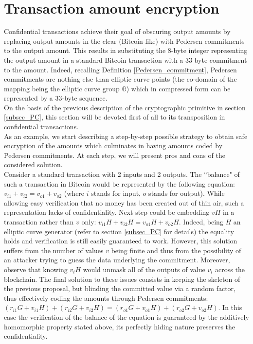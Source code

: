 \section{Transaction amount encryption}
\label{sec::tx_am_encr}
Confidential transactions achieve their goal of obscuring output amounts by replacing output amounts in the clear (Bitcoin-like) with Pedersen commitments to the output amount. This results in substituting the 8-byte integer representing the output amount in a standard Bitcoin transaction with a 33-byte commitment to the amount. Indeed, recalling Definition \ref{Pedersen_commitment}, Pedersen commitments are nothing else than elliptic curve points (the co-domain of the mapping being the elliptic curve group $\mathbb{G}$) which in compressed form can be represented by a 33-byte sequence.\\
On the basis of the previous description of the cryptographic primitive in section \ref{subsec_PC}, this section will be devoted first of all to its transposition in confidential transactions.\\
As an example, we start describing a step-by-step possible strategy to obtain safe encryption of the amounts which culminates in having amounts coded by Pedersen commitments. At each step, we will present pros and cons of the considered solution.\\
Consider a standard transaction with 2 inputs and 2 outputs. The ``balance" of such a transaction in Bitcoin would be represented by the following equation: $v_{i1} + v_{i2} = v_{o1} + v_{o2}$ (where $i$ stands for input, $o$ stands for output). While allowing easy verification that no money has been created out of thin air, such a representation lacks of confidentiality. Next step could be embedding $vH$ in a transaction rather than $v$ only: $v_{i1}H + v_{i2}H = v_{o1}H + v_{o2}H$. Indeed, being $H$ an elliptic curve generator (refer to section \ref{subsec_PC} for details) the equality holds and verification is still easily guaranteed to work. However, this solution suffers from the number of values $v$ being finite and thus from the possibility of an attacker trying to guess the data underlying the commitment. Moreover, observe that knowing $v_iH$ would unmask all of the outputs of value $v_i$ across the blockchain. The final solution to these issues consists in keeping the skeleton of the previous proposal, but blinding the committed value via a random factor, thus effectively coding the amounts through Pedersen commitments: $(r_{i1}G + v_{i1}H) + (r_{i2}G + v_{i2}H) = (r_{o1}G + v_{o1}H) + (r_{o2}G + v_{o2}H)$. In this case the verification of the balance of the equation is guaranteed by the additively homomorphic property stated above, its perfectly hiding nature preserves the confidentiality.\\
